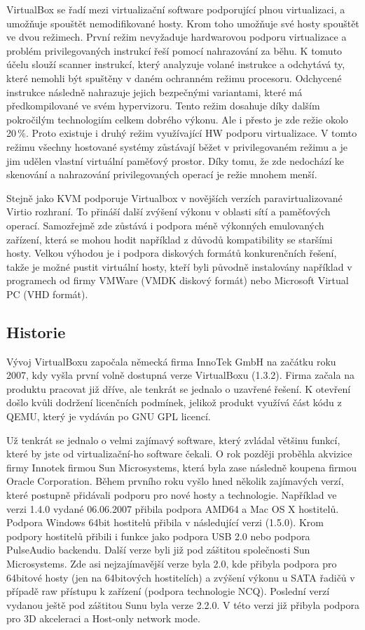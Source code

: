 VirtualBox se řadí mezi virtualizační software podporující plnou virtualizaci, a umožňuje spouštět nemodifikované hosty. Krom toho umožňuje své hosty spouštět ve dvou režimech. První režim nevyžaduje hardwarovou podporu virtualizace a problém privilegovaných instrukcí řeší pomocí nahrazování za běhu. K tomuto účelu slouží scanner instrukcí, který analyzuje volané instrukce a odchytává ty, které nemohli být spuštěny v daném ochranném režimu procesoru. Odchycené instrukce následně nahrazuje jejich bezpečnými variantami, které má předkompilované ve svém hypervizoru. Tento režim dosahuje díky dalším pokročilým technologiím celkem dobrého výkonu. Ale i přesto je zde režie okolo 20\,\%. Proto existuje i druhý režim využívající HW podporu virtualizace. V tomto režimu všechny hostované systémy zůstávají běžet v privilegovaném režimu a je jim udělen vlastní virtuální paměťový prostor. Díky tomu, že zde nedochází ke skenování a nahrazování privilegovaných operací je režie mnohem menší.

Stejně jako KVM podporuje Virtualbox v novějších verzích paravirtualizované Virtio rozhraní. To přináší další zvýšení výkonu v oblasti sítí a paměťových operací. Samozřejmě zde zůstává i podpora méně výkonných emulovaných zařízení, která se mohou hodit například z důvodů kompatibility se staršími hosty. Velkou výhodou je i podpora diskových formátů konkurenčních řešení, takže je možné pustit virtuální hosty, kteří byli původně instalovány například v programech od firmy VMWare (VMDK diskový formát) nebo Microsoft Virtual PC (VHD formát).

\subsection{Historie}

Vývoj VirtualBoxu započala německá firma InnoTek GmbH na začátku roku 2007, kdy vyšla první volně dostupná verze VirtualBoxu (1.3.2). Firma začala na produktu pracovat již dříve, ale tenkrát se jednalo o uzavřené řešení. K otevření došlo kvůli dodržení licenčních podmínek, jelikož produkt využívá část kódu z QEMU, který je vydáván po GNU GPL licencí.

Už tenkrát se jednalo o velmi zajímavý software, který zvládal většinu funkcí, které by jste od virtualizační-ho software čekali. O rok později proběhla akvizice firmy Innotek firmou Sun Microsystems, která byla zase následně koupena firmou Oracle Corporation.
Během prvního roku vyšlo hned několik zajímavých verzí, které postupně přidávali podporu pro nové hosty a technologie. Například ve verzi 1.4.0 vydané 06.06.2007 přibila podpora AMD64 a Mac OS X hostitelů. Podpora Windows 64bit hostitelů přibila v následující verzi (1.5.0). Krom podpory hostitelů přibili i funkce jako podpora USB 2.0 nebo podpora PulseAudio backendu. Další verze byli již pod záštitou společnosti Sun Microsystems. Zde asi nejzajímavější verze byla 2.0, kde přibyla podpora pro 64bitové hosty (jen na 64bitových hostitelích) a zvýšení výkonu u SATA řadičů v případě raw přístupu k zařízení (podpora technologie NCQ). Poslední verzí vydanou ještě pod záštitou Sunu byla verze 2.2.0. V této verzi již přibyla podpora pro 3D akceleraci a Host-only network mode.

